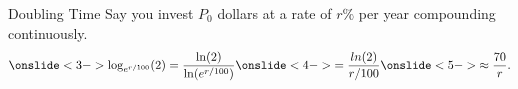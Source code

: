 \documentclass{beamer}
\theoremstyle{definition}
\begin{document}
\begin{frame}{Doubling Time}
  Say you invest $P_0$ dollars at a rate of $r\%$ per year compounding continuously.
  $$\onslide<3->{\log_{e^{r/100}}(2) = \frac{\ln(2)}{\ln(e^{r/100})}}\onslide<4->{ = \frac{ln(2)}{r/100}}\onslide<5->{ \approx \frac{70}{r}.}$$
\end{frame}
\end{document}
